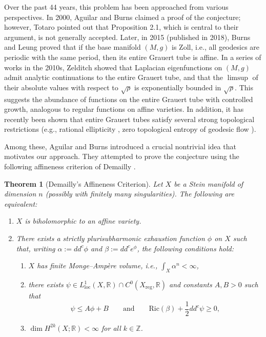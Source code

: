 \documentclass[a4paper, 12pt]{article}
\newcommand{\loc}{\mathrm{loc}}
\newtheorem{thm}{Theorem}[section]
\begin{document}
Over the past 44 years, this problem has been approached from various perspectives. In 2000, Aguilar and Burns \cite{AB00} claimed a proof of the conjecture; however, Totaro \cite{T03} pointed out that Proposition 2.1, which is central to their argument, is not generally accepted. Later, in 2015 (published in 2018), Burns and Leung \cite{BL18} proved that if the base manifold $(M,g)$ is Zoll, i.e., all geodesics are periodic with the same period, then its entire Grauert tube is affine. In a series of works in the 2010s, Zelditch \cite{Z11, Z17} showed that Laplacian eigenfunctions on $(M,g)$ admit analytic continuations to the entire Grauert tube, and that the $\limsup$ of their absolute values with respect to $\sqrt{\rho}$ is exponentially bounded in $\sqrt{\rho}$. This suggests the abundance of functions on the entire Grauert tube with controlled growth, analogous to regular functions on affine varieties. In addition, it has recently been shown that entire Grauert tubes satisfy several strong topological restrictions (e.g., rational ellipticity \cite{C24, N22}, zero topological entropy of geodesic flow \cite{S24}).

Among these, Aguilar and Burns \cite{AB00} introduced a crucial nontrivial idea that motivates our approach. They attempted to prove the conjecture using the following affineness criterion of Demailly \cite{D85}.

\begin{thm}[Demailly's Affineness Criterion]\label{DAC}
Let $X$ be a Stein manifold of dimension $n$ (possibly with finitely many singularities). The following are equivalent:
\begin{enumerate}
\item $X$ is biholomorphic to an affine variety.
\item There exists a strictly plurisubharmonic exhaustion function $\phi$ on $X$ such that, writing $\alpha := dd^c \phi$ and $\beta := dd^c e^{\phi}$, the following conditions hold:
\begin{enumerate}
\item $X$ has finite Monge--Amp\`ere volume, i.e., $\int_X \alpha^n < \infty$,
\item there exists $\psi \in L^1_\loc(X,\mathbb{R}) \cap C^0(X_{\mathrm{reg}},\mathbb{R})$ and constants $A,B>0$ such that
\[
\psi \le A\phi + B\qquad \text{and}\qquad\mathrm{Ric}(\beta) + \frac{1}{2} dd^c \psi \ge 0,
\]
\item $\dim H^{2k}(X;\mathbb{R}) < \infty$ for all $k \in \mathbb{Z}$.
\end{enumerate}
\end{enumerate}
\end{thm}
\end{document}
